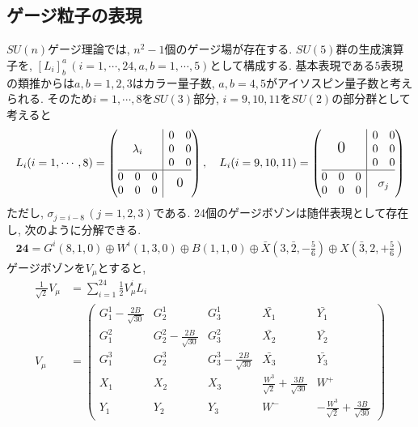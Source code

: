 \subsection{ゲージ粒子の表現}
$SU(n)$ゲージ理論では, $n^2-1$個のゲージ場が存在する.
$SU(5)$群の生成演算子を, $[L_i]^a_b\,(i=1,\cdots,24, a,b=1,\cdots,5)$として構成する.
基本表現である$5$表現の類推からは$a,b=1,2,3$はカラー量子数, $a,b=4,5$がアイソスピン量子数と考えられる.
そのため$i=1,\cdots,8$を$SU(3)$部分, $i=9,10,11$を$SU(2)$の部分群として考えると
\begin{align}
  L_i(i=1,\cdots,8) = \left(\begin{array}{@{}c|c@{}}
      \mbox{$\lambda_i$} &
      \begin{matrix}
        0 & 0 \\
        0 & 0 \\
        0 & 0 
      \end{matrix}\\
      \hline
      \begin{matrix}
        0 & 0 & 0\\
        0 & 0 & 0
      \end{matrix} &{\large{\mbox{$0$}}}
  \end{array}\right),\quad
  L_i(i=9,10,11) = \left(\begin{array}{@{}c|c@{}}
      \mbox{\Large 0} &
      \begin{matrix}
        0 & 0 \\
        0 & 0 \\
        0 & 0 
      \end{matrix}\\
      \hline
      \begin{matrix}
        0 & 0 & 0\\
        0 & 0 & 0
      \end{matrix} &{\mbox{$\sigma_j$}}
  \end{array}\right)
\end{align}
ただし, $\sigma_{j=i-8}\,(j=1,2,3)$である.
24個のゲージボゾンは随伴表現として存在し, 次のように分解できる.
\begin{align}
  \bm{24} = G^i(8,1,0)\oplus W^i(1,3,0)\oplus B(1,1,0)\oplus \bar{X}(3,\bar{2},-\frac{5}{6})\oplus X(\bar{3},2,+\frac{5}{6})
\end{align}
ゲージボゾンを$V_\mu$とすると,
\begin{align}
  \frac{1}{\sqrt{2}}V_\mu &= \sum_{i=1}^{24}\frac{1}{2}V_\mu^i L_i\\
  V_\mu &= \left(\begin{array}{ccccc}
    G^1_1 - \frac{2B}{\sqrt{30}} & G^1_2 & G^1_3 & \bar{X_1} & \bar{Y_1} \\
    G^2_1 & G^2_2 - \frac{2B}{\sqrt{30}} & G^2_3 & \bar{X_2} & \bar{Y_2} \\
    G^3_1 & G^3_2 & G^3_3 - \frac{2B}{\sqrt{30}} & \bar{X_3} & \bar{Y_3} \\
    X_1   & X_2 & X_3 & \frac{W^3}{\sqrt{2}} + \frac{3B}{\sqrt{30}} & W^+ \\
    Y_1   & Y_2 & Y_3 & W^- &    -\frac{W^3}{\sqrt{2}} + \frac{3B}{\sqrt{30}} 
      \end{array}
  \right)
\end{align}
